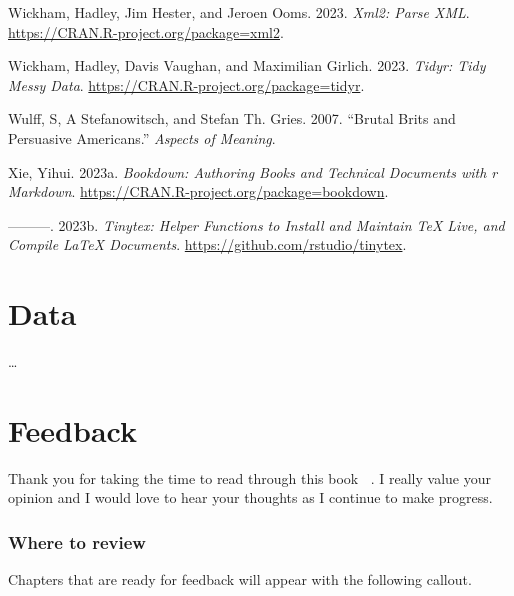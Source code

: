 \documentclass[
  letterpaper,
  DIV=11,
  numbers=noendperiod]{scrreport}
\newlength{\cslhangindent}
\newlength{\cslentryspacingunit} %
\newenvironment{CSLReferences}[2] %
 {%
  \setlength{\parindent}{0pt}
  \ifodd #1
  \let\oldpar\par
  \def\par{\hangindent=\cslhangindent\oldpar}
  \fi
  \setlength{\parskip}{#2\cslentryspacingunit}
 }%
 {}
\theoremstyle{definition}
\theoremstyle{remark}
\begin{document}
\begin{CSLReferences}{1}{0}
\leavevmode{}%
Wickham, Hadley, Jim Hester, and Jeroen Ooms. 2023. \emph{Xml2: Parse
XML}. \url{https://CRAN.R-project.org/package=xml2}.

\leavevmode{}%
Wickham, Hadley, Davis Vaughan, and Maximilian Girlich. 2023.
\emph{Tidyr: Tidy Messy Data}.
\url{https://CRAN.R-project.org/package=tidyr}.

\leavevmode{}%
Wulff, S, A Stefanowitsch, and Stefan Th. Gries. 2007. {``Brutal Brits
and Persuasive Americans.''} \emph{Aspects of Meaning}.

\leavevmode{}%
Xie, Yihui. 2023a. \emph{Bookdown: Authoring Books and Technical
Documents with r Markdown}.
\url{https://CRAN.R-project.org/package=bookdown}.

\leavevmode{}%
---------. 2023b. \emph{Tinytex: Helper Functions to Install and
Maintain TeX Live, and Compile LaTeX Documents}.
\url{https://github.com/rstudio/tinytex}.

\end{CSLReferences}

\cleardoublepage
{}
{}
\appendix

\hypertarget{data-appendix}{%
\chapter{Data}\label{data-appendix}}

\ldots{}

\hypertarget{feedback-appendix}{%
\chapter{\texorpdfstring{Feedback
}{Feedback }}\label{feedback-appendix}}

Thank you for taking the time to read through this book 🫶🏻. I really
value your opinion and I would love to hear your thoughts as I continue
to make progress.

\hypertarget{where-to-review}{%
\subsection*{Where to review}\label{where-to-review}}

Chapters that are ready for feedback will appear with the following
callout.
\end{document}
